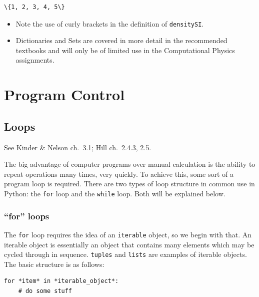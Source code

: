 \documentclass[10pt]{article}
\begin{document}
    \begin{Verbatim}[commandchars=\\\{\}]
\{1, 2, 3, 4, 5\}
    \end{Verbatim}

    \begin{itemize}
\item
  Note the use of curly brackets in the definition of
  \texttt{densitySI}.
\item
  Dictionaries and Sets are covered in more detail in the recommended
  textbooks and will only be of limited use in the Computational Physics
  assignments.
\end{itemize}

    \hypertarget{program-control}{%
\section{Program Control}\label{program-control}}

\hypertarget{loops}{%
\subsection{Loops}\label{loops}}

See Kinder \& Nelson ch.~3.1; Hill ch.~2.4.3, 2.5.

The big advantage of computer programs over manual calculation is the
ability to repeat operations many times, very quickly. To achieve this,
some sort of a program loop is required. There are two types of loop
structure in common use in Python: the \texttt{for} loop and the
\texttt{while} loop. Both will be explained below. 
\subsubsection{``for''
loops} The \texttt{for} loop requires the idea of an \texttt{iterable}
object, so we begin with that. An iterable object is essentially an
object that contains many elements which may be cycled through in
sequence. \texttt{tuples} and \texttt{lists} are examples of iterable
objects. The basic structure is as follows:

\begin{verbatim}
for *item* in *iterable_object*:
    # do some stuff
  
\end{verbatim}
\end{document}

